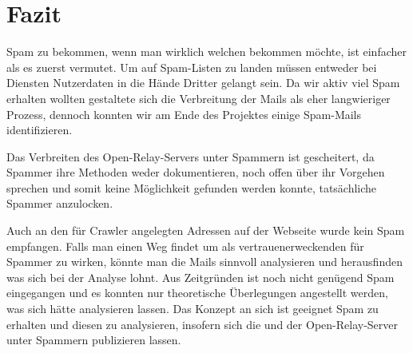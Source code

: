 \documentclass[a4paper,11pt,singlespacing]{article}
\begin{document}
\newpage


\section{Fazit}\label{sec:Fazit}
	Spam zu bekommen, wenn man wirklich welchen bekommen möchte, ist einfacher als es zuerst vermutet.
	Um auf Spam-Listen zu landen müssen entweder bei Diensten Nutzerdaten in die Hände Dritter gelangt sein.
	Da wir aktiv viel Spam erhalten wollten gestaltete sich die Verbreitung der Mails als eher langwieriger Prozess, dennoch konnten wir am Ende des Projektes einige Spam-Mails identifizieren.

	Das Verbreiten des Open-Relay-Servers unter Spammern ist gescheitert, da Spammer ihre Methoden weder dokumentieren, noch offen über ihr Vorgehen sprechen und somit keine Möglichkeit gefunden werden konnte, tatsächliche Spammer anzulocken.

	Auch an den für Crawler angelegten Adressen auf der Webseite wurde kein Spam empfangen.
	Falls man einen Weg findet um als vertrauenerweckenden  für Spammer zu wirken, könnte man die Mails sinnvoll analysieren und herausfinden was sich bei der Analyse lohnt.
	Aus Zeitgründen ist noch nicht genügend Spam eingegangen und es konnten nur theoretische Überlegungen angestellt werden, was sich hätte analysieren lassen.
	Das Konzept an sich ist geeignet Spam zu erhalten und diesen zu analysieren, insofern sich die  und der Open-Relay-Server unter Spammern publizieren lassen.

\newpage




\newpage


\listoffigures
{}
\newpage
\end{document}
